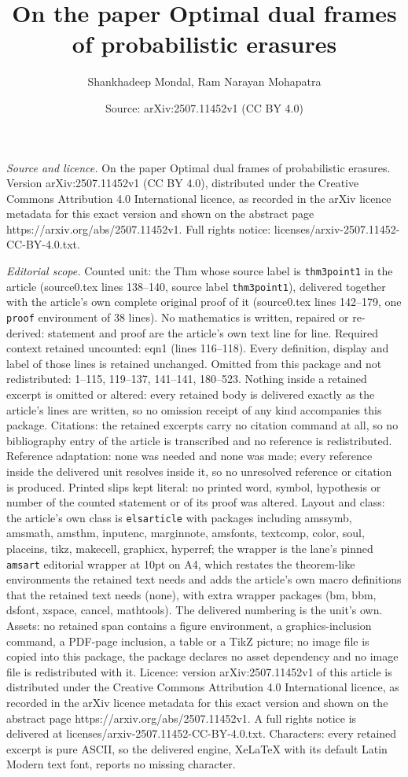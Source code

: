 \documentclass[10pt,a4paper]{amsart}
\title[On the paper Optimal dual frames of probabilistic erasures]{On the paper Optimal dual frames of probabilistic erasures}
\author{Shankhadeep Mondal, Ram Narayan Mohapatra}
\date{Source: arXiv:2507.11452v1 (CC BY 4.0)}
\begin{document}
\maketitle

\noindent\emph{Source and licence.} On the paper Optimal dual frames of probabilistic erasures. Version arXiv:2507.11452v1 (CC BY 4.0), distributed under the Creative Commons Attribution 4.0 International licence, as recorded in the arXiv licence metadata for this exact version and shown on the abstract page https://arxiv.org/abs/2507.11452v1. Full rights notice: licenses/arxiv-2507.11452-CC-BY-4.0.txt.\par\smallskip

\noindent\textit{Editorial scope.} Counted unit: the Thm whose source label is \texttt{thm3point1} in the article (source0.tex lines 138--140, source label \texttt{thm3point1}), delivered together with the article's own complete original proof of it (source0.tex lines 142--179, one \texttt{proof} environment of 38 lines). No mathematics is written, repaired or re-derived: statement and proof are the article's own text line for line. Required context retained uncounted: eqn1 (lines 116--118). Every definition, display and label of those lines is retained unchanged. Omitted from this package and not redistributed: 1--115, 119--137, 141--141, 180--523. Nothing inside a retained excerpt is omitted or altered: every retained body is delivered exactly as the article's lines are written, so no omission receipt of any kind accompanies this package. Citations: the retained excerpts carry no citation command at all, so no bibliography entry of the article is transcribed and no reference is redistributed. Reference adaptation: none was needed and none was made; every reference inside the delivered unit resolves inside it, so no unresolved reference or citation is produced. Printed slips kept literal: no printed word, symbol, hypothesis or number of the counted statement or of its proof was altered. Layout and class: the article's own class is \texttt{elsarticle} with packages including amssymb, amsmath, amsthm, inputenc, marginnote, amsfonts, textcomp, color, soul, placeins, tikz, makecell, graphicx, hyperref; the wrapper is the lane's pinned \texttt{amsart} editorial wrapper at 10pt on A4, which restates the theorem-like environments the retained text needs and adds the article's own macro definitions that the retained text needs (none), with extra wrapper packages (bm, bbm, dsfont, xspace, cancel, mathtools). The delivered numbering is the unit's own. Assets: no retained span contains a figure environment, a graphics-inclusion command, a PDF-page inclusion, a table or a TikZ picture; no image file is copied into this package, the package declares no asset dependency and no image file is redistributed with it. Licence: version arXiv:2507.11452v1 of this article is distributed under the Creative Commons Attribution 4.0 International licence, as recorded in the arXiv licence metadata for this exact version and shown on the abstract page https://arxiv.org/abs/2507.11452v1. A full rights notice is delivered at licenses/arxiv-2507.11452-CC-BY-4.0.txt. Characters: every retained excerpt is pure ASCII, so the delivered engine, XeLaTeX with its default Latin Modern text font, reports no missing character.
\end{document}

